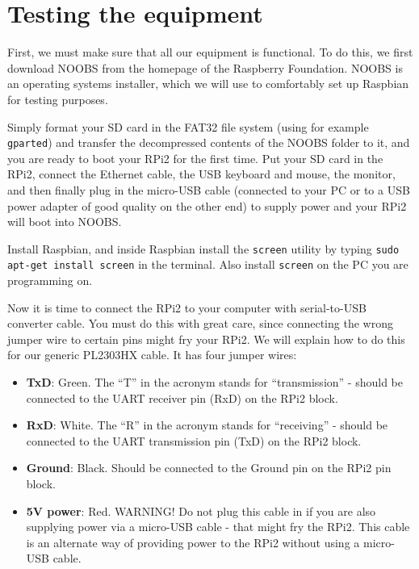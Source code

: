 \documentclass[a4paper,11pt,reqno]{amsart}
\begin{document}
\section{Testing the equipment}
First, we must make sure that all our equipment is functional. To do this, we first download NOOBS from the homepage of the Raspberry Foundation. NOOBS is an operating systems installer, which we will use to comfortably set up Raspbian for testing purposes.

Simply format your SD card in the FAT32 file system (using for example \texttt{gparted}) and transfer the decompressed contents of the NOOBS folder to it, and you are ready to boot your RPi2 for the first time. Put your SD card in the RPi2, connect the Ethernet cable, the USB keyboard and mouse, the monitor, and then finally plug in the micro-USB cable (connected to your PC or to a USB power adapter of good quality on the other end) to supply power and your RPi2 will boot into NOOBS.

Install Raspbian, and inside Raspbian install the \texttt{screen} utility by typing \texttt{sudo apt-get install screen} in the terminal. Also install \texttt{screen} on the PC you are programming on.

Now it is time to connect the RPi2 to your computer with serial-to-USB converter cable. You must do this with great care, since connecting the wrong jumper wire to certain pins might fry your RPi2. We will explain how to do this for our generic PL2303HX cable. It has four jumper wires:

\begin{itemize}
  \item \textbf{TxD}: Green. The ``T'' in the acronym stands for ``transmission'' - should be connected to the UART receiver pin (RxD) on the RPi2 block.
  \item \textbf{RxD}: White. The ``R'' in the acronym stands for ``receiving'' - should be connected to the UART transmission pin (TxD) on the RPi2 block.
  \item \textbf{Ground}: Black. Should be connected to the Ground pin on the RPi2 pin block.
  \item \textbf{5V power}: Red. WARNING! Do not plug this cable in if you are also supplying power via a micro-USB cable - that might fry the RPi2. This cable is an alternate way of providing power to the RPi2 without using a micro-USB cable.
\end{itemize}
\end{document}
